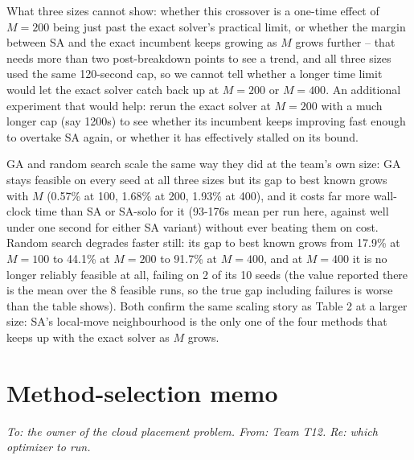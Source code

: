 \documentclass[11pt,a4paper]{article}
\begin{document}
What three sizes cannot show: whether this crossover is a one-time effect of $M{=}200$ being just past the exact solver's practical limit, or whether the margin between SA and the exact incumbent keeps growing as $M$ grows further -- that needs more than two post-breakdown points to see a trend, and all three sizes used the same 120-second cap, so we cannot tell whether a longer time limit would let the exact solver catch back up at $M{=}200$ or $M{=}400$. An additional experiment that would help: rerun the exact solver at $M{=}200$ with a much longer cap (say 1200s) to see whether its incumbent keeps improving fast enough to overtake SA again, or whether it has effectively stalled on its bound.

GA and random search scale the same way they did at the team's own size: GA stays feasible on every seed at all three sizes but its gap to best known grows with $M$ (0.57\% at 100, 1.68\% at 200, 1.93\% at 400), and it costs far more wall-clock time than SA or SA-solo for it (93-176s mean per run here, against well under one second for either SA variant) without ever beating them on cost. Random search degrades faster still: its gap to best known grows from 17.9\% at $M{=}100$ to 44.1\% at $M{=}200$ to 91.7\% at $M{=}400$, and at $M{=}400$ it is no longer reliably feasible at all, failing on 2 of its 10 seeds (the value reported there is the mean over the 8 feasible runs, so the true gap including failures is worse than the table shows). Both confirm the same scaling story as Table 2 at a larger size: SA's local-move neighbourhood is the only one of the four methods that keeps up with the exact solver as $M$ grows.

\section{Method-selection memo}

\emph{To: the owner of the cloud placement problem. From: Team T12. Re: which optimizer to run.}
\end{document}
